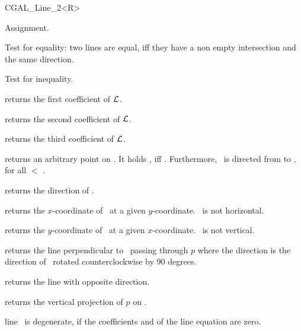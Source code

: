 \begin {classtemplate} {CGAL_Line_2<R>}
\operations
\threecolumns{5cm}{4cm}

\hidden {}
        {Assignment.}

       {Test for equality: two lines are equal, iff they have a non 
        empty intersection and the same direction.}

       {Test for inequality.}


       {returns the first coefficient of ${\cal L}$.}

       {returns the second coefficient of ${\cal L}$.}

       {returns the third coefficient of ${\cal L}$.}

       {returns an arbitrary point on \var. It holds 
        , iff .
        Furthermore, \var\ is directed from 
        to , for all  $<$ .}

       {returns the direction of \var.}

       {returns the $x$-coordinate of \var\ at a given $y$-coordinate.
        \precond \var\ is not horizontal.}

       {returns the $y$-coordinate of \var\ at a given $x$-coordinate.
        \precond \var\ is not vertical.}

        {returns the line perpendicular to \var\ passing through $p$ where the
         direction is the direction of \var\ rotated counterclockwise by
         90 degrees.}

       {returns the line with opposite direction.}

       {returns the vertical projection of $p$ on \var.}

       {line \var\ is degenerate, if the coefficients  and 
         of the line equation are zero.}


\end{classtemplate}
